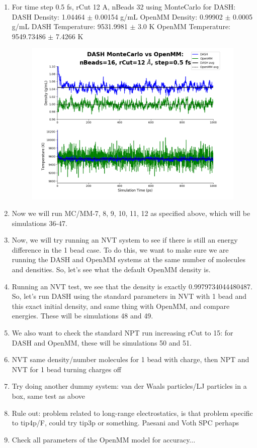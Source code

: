 \documentclass[12pt,reqno]{amsart}
\numberwithin{equation}{section}
\begin{document}
\begin{enumerate}
\item For time step 0.5 fs, rCut 12 A, nBeads 32 using MonteCarlo for DASH:
\subitem DASH Density: 1.04464 $\pm$ 0.00154 g/mL
\subitem OpenMM Density: 0.99902 $\pm$ 0.0005 g/mL
\subitem DASH Temperature: 9531.9981 $\pm$ 3.0  K
\subitem OpenMM Temperature:  9549.73486 $\pm$ 7.4266 K
\begin{figure}[H]
\centering
\includegraphics[scale=0.7]{MC-MM-nBead32-rCut12-ts05}
\end{figure}

\item Now we will run MC/MM-7, 8, 9, 10, 11, 12 as specified above, which will be simulations 36-47. 
\item Now, we will try running an NVT system to see if there is still an energy difference in the 1 bead case.  To do this, we want to make sure we are running the DASH and OpenMM systems at the same number of molecules and densities.  So, let's see what the default OpenMM density is.
\item Running an NVT test, we see that the density is exactly 0.9979734044480487.  So, let's run DASH using the standard parameters in NVT with 1 bead and this exact initial density, and same thing with OpenMM, and compare energies.  These will be simulations 48 and 49.   
\item We also want to check the standard NPT run increasing rCut to 15: for DASH and OpenMM, these will be simulations 50 and 51.  


\item NVT same density/number molecules for 1 bead with charge, then NPT and NVT for 1 bead turning charges off
\item Try doing another dummy system: van der Waals particles/LJ particles in a box, same test as above 
\item Rule out: problem related to long-range electrostatics, is that problem specific to tip4p/F, could try tip3p or something.  Paesani and Voth SPC perhaps
\item Check all parameters of the OpenMM model for accuracy...
\end{enumerate}
\end{document}
